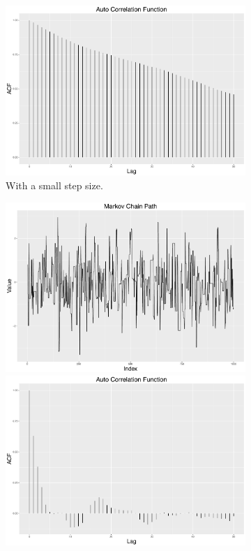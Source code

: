 \begin{figure}[h]
\begin{subfigure}[b]{0.32\textwidth}
    \includegraphics[width=\textwidth]{Chapters/05MCMCOU/plots/ggsmallacf.pdf}
    \caption{With a small step size. }
\end{subfigure}
\begin{subfigure}[b]{0.32\textwidth}
    \includegraphics[width=\textwidth]{Chapters/05MCMCOU/plots/ggbestchain.pdf}
    \includegraphics[width=\textwidth]{Chapters/05MCMCOU/plots/ggbestacf.pdf}

\end{subfigure}
\end{figure}
